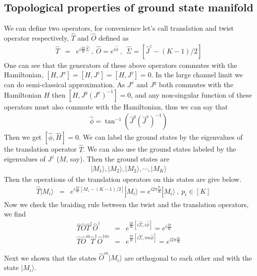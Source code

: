 \documentclass[reprint,prb,superscriptaddress]{revtex4-2}
\begin{document}
\subsection{Topological properties of ground state manifold}
\noindent  We can define two operators, for convenience let's call translation and twist operator respectively, $\hat{T}$ and $\hat{O}$ defined as 
\begin{eqnarray}
\hat{T} &=& e^{i\frac{2\pi}{K} \hat{\Sigma}} ~,~\hat{O} = e^{i\hat{\phi}}~,~~\hat{\Sigma}=[\hat{J}^z-(K-1)/2]
\end{eqnarray}
One can see that the generators of these above operators commutes with the Hamiltonian, $[H,J^x]=[H,J^z]=[H,J^z]=0$. In the large channel limit we can do semi-classical approximation. As $J^x$ and $J^y$ both commutes with the Hamiltonian $H$ then $[H,J^y{(J^{x})}^{-1}]=0$, and any non-singular function of these operators must also commute with the Hamiltonian, thus we can say that
\begin{eqnarray}
\hat{\phi}=\tan^{-1}(\hat{J}^y(\hat{J}^x)^{-1})
\end{eqnarray}
Then we get $[\hat{\phi},\hat{H}]=0$. We can label the ground states by the eigenvalues of the translation operator $\hat{T}$. We can also use the ground states labeled by the eigenvalues of $J^z$ ($M$, say). Then the ground states are 
\begin{eqnarray}
|M_1\rangle,|M_2\rangle,|M_2\rangle,\cdots ,|M_K\rangle
\end{eqnarray}
Then the operations of the translation operators on this states are give below.
\begin{eqnarray}
\hat{T}|M_i\rangle &=& e^{i\frac{2\pi}{K} [M_i-(K-1)/2]} |M_i\rangle = e^{i2\pi\frac{p_i}{K} } |M_i\rangle~,~p_i\in[K]~~~~~~~
\end{eqnarray}
Now we check the braiding rule between the twist and the translation operators, we find
\begin{eqnarray}
\hat{T}\hat{O}\hat{T}^{\dagger}\hat{O}^{\dagger} &=& e^{\frac{2\pi }{K}[i\hat{\Sigma},i\hat{\phi}]}=e^{i\frac{2\pi }{K}} \nonumber\\
\hat{T}\hat{O}^m\hat{T}^{\dagger}\hat{O}^{\dagger m} &=& e^{\frac{2\pi }{K}[i\hat{\Sigma},im\hat{\phi}]}=e^{i2\pi \frac{m}{K}}
\end{eqnarray}

Next we shown that the states $\hat{O}^m |M_i\rangle$ are orthogonal to each other and with the state $|M_i\rangle$.
\end{document}
